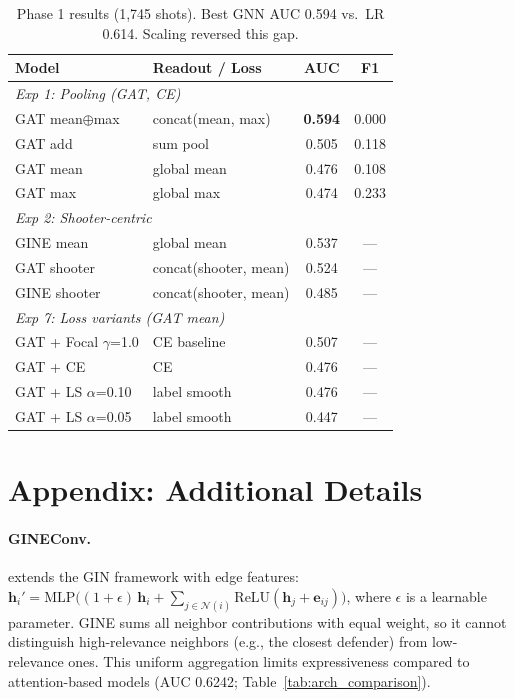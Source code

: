 \documentclass{article}
\begin{document}
\begin{table}[H]
\centering
\caption{Phase 1 results (1,745 shots). Best GNN AUC 0.594 vs.\ LR 0.614. Scaling reversed this gap.}
\label{tab:phase1}
\small
\begin{tabular}{@{}llcc@{}}
\toprule
\textbf{Model} & \textbf{Readout / Loss} & \textbf{AUC} & \textbf{F1} \\
\midrule
\multicolumn{4}{l}{\emph{Exp 1: Pooling (GAT, CE)}} \\
GAT mean$\oplus$max & concat(mean, max) & \textbf{0.594} & 0.000 \\
GAT add & sum pool & 0.505 & 0.118 \\
GAT mean & global mean & 0.476 & 0.108 \\
GAT max & global max & 0.474 & 0.233 \\
\midrule
\multicolumn{4}{l}{\emph{Exp 2: Shooter-centric}} \\
GINE mean & global mean & 0.537 & --- \\
GAT shooter & concat(shooter, mean) & 0.524 & --- \\
GINE shooter & concat(shooter, mean) & 0.485 & --- \\
\midrule
\multicolumn{4}{l}{\emph{Exp 7: Loss variants (GAT mean)}} \\
GAT + Focal $\gamma$=1.0 & CE baseline & 0.507 & --- \\
GAT + CE & CE & 0.476 & --- \\
GAT + LS $\alpha$=0.10 & label smooth & 0.476 & --- \\
GAT + LS $\alpha$=0.05 & label smooth & 0.447 & --- \\
\bottomrule
\end{tabular}
\end{table}

\clearpage

\section{Appendix: Additional Details}
\label{app:additional_details}

\paragraph{GINEConv.}
\hypertarget{app:gineconv}{}
\citep{hu2020gine} extends the GIN framework \citep{xu2019gin} with edge features:
$\mathbf{h}_i' = \text{MLP}\!\big((1+\epsilon)\,\mathbf{h}_i + \sum_{j \in \mathcal{N}(i)} \text{ReLU}(\mathbf{h}_j + \mathbf{e}_{ij})\big)$,
where $\epsilon$ is a learnable parameter. GINE sums all neighbor contributions with equal weight, so it cannot distinguish high-relevance neighbors (e.g., the closest defender) from low-relevance ones. This uniform aggregation limits expressiveness compared to attention-based models (AUC 0.6242; Table~\ref{tab:arch_comparison}).
\end{document}
